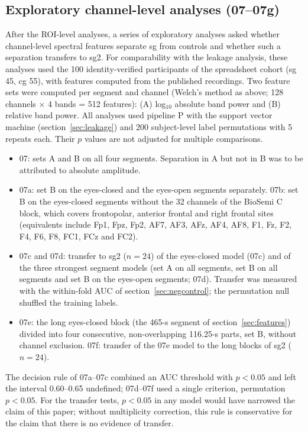 \subsection{Exploratory channel-level analyses (07--07g)}
\label{sec:exploratory}

After the ROI-level analyses, a series of exploratory analyses asked whether channel-level spectral features separate sg from controls and whether such a separation transfers to sg2. For comparability with the leakage analysis, these analyses used the 100 identity-verified participants of the spreadsheet cohort (sg 45, cg 55), with features computed from the published recordings. Two feature sets were computed per segment and channel (Welch's method as above; 128 channels $\times$ 4 bands = 512 features): (A) log$_{10}$ absolute band power and (B) relative band power. All analyses used pipeline P with the support vector machine (section~\ref{sec:leakage}) and 200 subject-level label permutations with 5 repeats each. Their $p$ values are not adjusted for multiple comparisons.

\begin{itemize}
  \item 07: sets A and B on all four segments. Separation in A but not in B was to be attributed to absolute amplitude.
  \item 07a: set B on the eyes-closed and the eyes-open segments separately. 07b: set B on the eyes-closed segments without the 32 channels of the BioSemi C block, which covers frontopolar, anterior frontal and right frontal sites (equivalents include Fp1, Fpz, Fp2, AF7, AF3, AFz, AF4, AF8, F1, Fz, F2, F4, F6, F8, FC1, FCz and FC2).
  \item 07c and 07d: transfer to sg2 ($n = 24$) of the eyes-closed model (07c) and of the three strongest segment models (set A on all segments, set B on all segments and set B on the eyes-open segments; 07d). Transfer was measured with the within-fold AUC of section~\ref{sec:negcontrol}; the permutation null shuffled the training labels.
  \item 07e: the long eyes-closed block (the 465-s segment of section~\ref{sec:features}) divided into four consecutive, non-overlapping 116.25-s parts, set B, without channel exclusion. 07f: transfer of the 07e model to the long blocks of sg2 ($n = 24$).
\end{itemize}

The decision rule of 07a--07c combined an AUC threshold with $p < 0.05$ and left the interval 0.60--0.65 undefined; 07d--07f used a single criterion, permutation $p < 0.05$. For the transfer tests, $p < 0.05$ in any model would have narrowed the claim of this paper; without multiplicity correction, this rule is conservative for the claim that there is no evidence of transfer.

